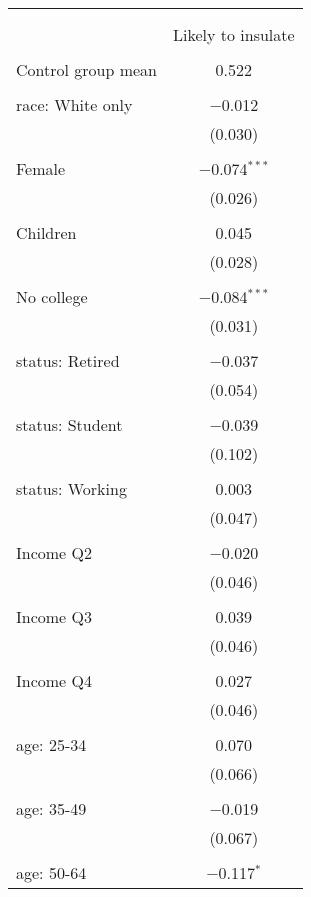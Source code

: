 
\begin{tabular}{@{\extracolsep{5pt}}lc} 
\\[-1.8ex]\hline 
\hline \\[-1.8ex] 
\\[-1.8ex] & Likely to insulate \\ 
\hline \\[-1.8ex] 
 Control group mean & 0.522  \\ \hline \\[-1.8ex] race: White only & $-$0.012 \\ 
  & (0.030) \\ 
  & \\ 
 Female & $-$0.074$^{***}$ \\ 
  & (0.026) \\ 
  & \\ 
 Children & 0.045 \\ 
  & (0.028) \\ 
  & \\ 
 No college & $-$0.084$^{***}$ \\ 
  & (0.031) \\ 
  & \\ 
 status: Retired & $-$0.037 \\ 
  & (0.054) \\ 
  & \\ 
 status: Student & $-$0.039 \\ 
  & (0.102) \\ 
  & \\ 
 status: Working & 0.003 \\ 
  & (0.047) \\ 
  & \\ 
 Income Q2 & $-$0.020 \\ 
  & (0.046) \\ 
  & \\ 
 Income Q3 & 0.039 \\ 
  & (0.046) \\ 
  & \\ 
 Income Q4 & 0.027 \\ 
  & (0.046) \\ 
  & \\ 
 age: 25-34 & 0.070 \\ 
  & (0.066) \\ 
  & \\ 
 age: 35-49 & $-$0.019 \\ 
  & (0.067) \\ 
  & \\ 
 age: 50-64 & $-$0.117$^{*}$ \\ 

\end{tabular}
